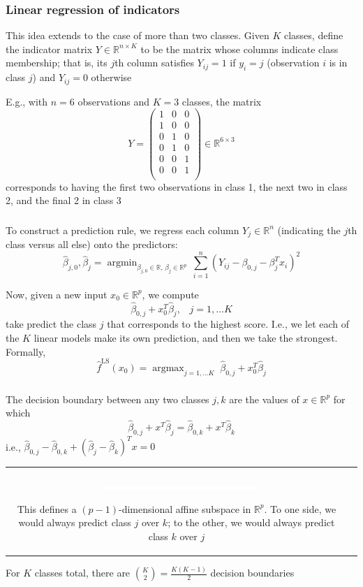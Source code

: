 \documentclass[mathserif]{beamer}
\newcommand{\argmax}{\mathop{\mathrm{argmax}}}
\newcommand{\argmin}{\mathop{\mathrm{argmin}}}
\def\R{\mathds{R}}
\def\hbeta{\hat{\beta}}
\def\red{\color[rgb]{0.8,0,0}}
\begin{document}
\begin{frame}
\frametitle{Linear regression of indicators}
This idea extends to the case of more than two classes. Given $K$ classes,
define the {\red indicator matrix} $Y \in \R^{n\times K}$ to be the matrix
whose columns indicate class membership; that is, its $j$th column satisfies
$Y_{ij} = 1$ if $y_i=j$ (observation $i$ is in class $j$) and $Y_{ij}=0$ 
otherwise

\bigskip
E.g., with $n=6$ observations and $K=3$ classes, the matrix 
$$Y = 
\left(\begin{array}{ccc}
1 & 0 & 0 \\
1 & 0 & 0 \\
0 & 1 & 0 \\
0 & 1 & 0 \\
0 & 0 & 1 \\
0 & 0 & 1 \\
\end{array}\right) \in \R^{6 \times 3}$$
corresponds to having the first two observations in class 1, the next two
in class 2, and the final 2 in class 3
\end{frame}

\begin{frame}
\frametitle{}
To construct a prediction rule, we regress 
each column $Y_j \in \R^n$ (indicating the $j$th class versus all else)
onto the predictors:
$$\hbeta_{j,0}, \hbeta_j = \argmin_{\beta_{j,0}\in\R,\,\beta_j \in \R^p} 
\, \sum_{i=1}^n (Y_{ij} - \beta_{0,j} - \beta_j^T x_i)^2$$

Now, given a new input $x_0 \in \R^p$, we compute
$$\hbeta_{0,j} + x_0^T \hbeta_j, \;\;\; j=1,\ldots K$$
take predict the class $j$ that corresponds to the highest score. I.e., we let
each of the $K$ linear models {\red make its own prediction}, and then we take 
the strongest. Formally, $$\hat{f}^\mathrm{LS}(x_0) = 
\argmax_{j=1,\ldots K} \; \hbeta_{0,j} + x_0^T \hbeta_j $$
\end{frame}

\begin{frame}
\frametitle{}
The {\red decision boundary} between any two classes $j,k$ are the values of
$x \in \R^p$ for which 
$$\hbeta_{0,j} + x^T \hbeta_j  = \hbeta_{0,k} + x^T \hbeta_k$$
i.e., $\hbeta_{0,j}-\hbeta_{0,k} + (\hbeta_j-\hbeta_k)^T x = 0$

\bigskip
\bigskip
\begin{tabular}{cc}
\parbox{0.475\textwidth}{
\includegraphics[width=0.475\textwidth]{blank.png}}
\hspace{-15pt}
\parbox{0.5\textwidth}{
This defines a $(p-1)$-dimensional affine subspace in $\R^p$. 
To one side, we would always predict class $j$
over $k$; to the other, we would always predict class $k$ over $j$}
\end{tabular}

\bigskip
\bigskip
\bigskip
For $K$ classes total, there are ${K \choose 2}=\frac{K(K-1)}{2}$ decision boundaries
\end{frame}
\end{document}
